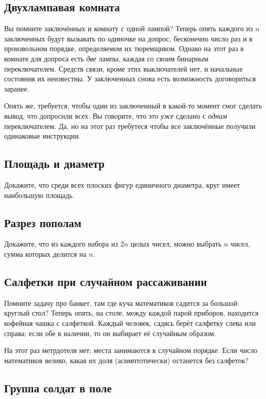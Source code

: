 \subsection*{Двухлампавая комната}%

Вы помните заключённых и комнату с одной лампой?
Теперь опять каждого из $n$ заключенных будут вызывать по одиночке на допрос, бесконечно число раз и в произвольном порядке, определяемом их тюремщиком.
Однако на этот раз в комнате для допроса есть \emph{две} лампы, каждая со своим бинарным переключателем.
Средств связи, кроме этих выключателей нет, и начальные состояния их неизвестны.
У заключенных снова есть возможность договориться заранее.

Опять же, требуется, чтобы один из заключенный в какой-то момент смог сделать вывод, что допросили всех.
Вы говорите, что это \emph{уже} сделано с \emph{одним} переключателем.
Да, но на этот раз требутеся чтобы все заключённые получили одинаковые инструкции.

\subsection*{Площадь и диаметр}

Докажите, что среди всех плоских фигур единичного диаметра, круг имеет наибольшую площадь.

\subsection*{Разрез пополам}
Докажите, что из каждого набора из $2n$ целых чисел, можно выбрать $n$ чисел, сумма которых делится на $n$.

\subsection*{Салфетки при случайном рассаживании}

Помните задачу про банкет, там где куча математиков садится за большой круглый стол?
Теперь опять, на столе, между каждой парой приборов, находится кофейная чашка с салфеткой.
Каждый человек, садясь берёт салфетку слева или справа;
если обе в наличии, то он выбирает её случайным образом.

На этот раз метрдотеля нет; места занимаются в случайном порядке.
Если число математиков велико, какая их доля (асимптотически) останется без салфеток?

\subsection*{Группа солдат в поле}

